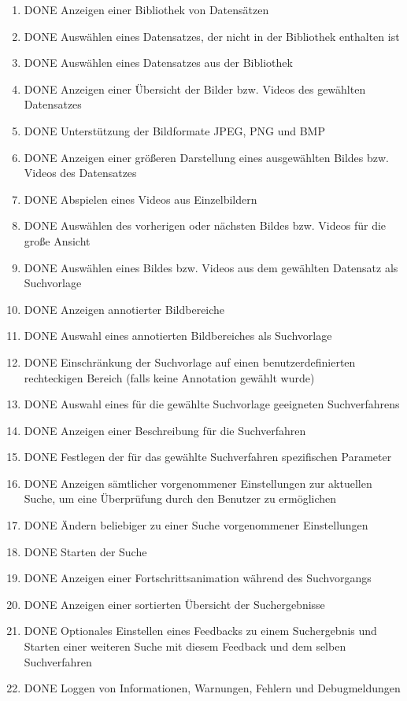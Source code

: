 \begin{enumerate} [label=\bfseries /F \arabic*0/, leftmargin=*]
	\item DONE Anzeigen einer Bibliothek von Datensätzen
	\item DONE Auswählen eines Datensatzes, der nicht in der Bibliothek enthalten ist
	\item DONE Auswählen eines Datensatzes aus der Bibliothek
	\item DONE Anzeigen einer Übersicht der Bilder bzw. Videos des gewählten Datensatzes
	\item DONE Unterstützung der Bildformate JPEG, PNG und BMP
	\item DONE Anzeigen einer größeren Darstellung eines ausgewählten Bildes bzw. Videos des Datensatzes
	\item DONE Abspielen eines Videos aus Einzelbildern
	\item DONE Auswählen des vorherigen oder nächsten Bildes bzw. Videos für die große Ansicht
	\item DONE Auswählen eines Bildes bzw. Videos aus dem gewählten Datensatz als Suchvorlage
	\item DONE Anzeigen annotierter Bildbereiche
	\item DONE Auswahl eines annotierten Bildbereiches als Suchvorlage
	\item DONE Einschränkung der Suchvorlage auf einen benutzerdefinierten rechteckigen Bereich (falls keine Annotation gewählt wurde)
	\item DONE Auswahl eines für die gewählte Suchvorlage geeigneten Suchverfahrens
	\item DONE Anzeigen einer Beschreibung für die Suchverfahren
	\item DONE Festlegen der für das gewählte Suchverfahren spezifischen Parameter
	\item DONE Anzeigen sämtlicher vorgenommener Einstellungen zur aktuellen Suche, um eine Überprüfung durch den Benutzer zu ermöglichen
	\item DONE Ändern beliebiger zu einer Suche vorgenommener Einstellungen
	\newline
	\item DONE Starten der Suche
	\item DONE Anzeigen einer Fortschrittsanimation während des Suchvorgangs
	\newline
	\item DONE Anzeigen einer sortierten Übersicht der Suchergebnisse
	\item DONE Optionales Einstellen eines Feedbacks zu einem Suchergebnis und Starten einer weiteren Suche mit diesem Feedback und dem selben Suchverfahren
	
	\item DONE Loggen von Informationen, Warnungen, Fehlern und Debugmeldungen
	 
\end{enumerate}

